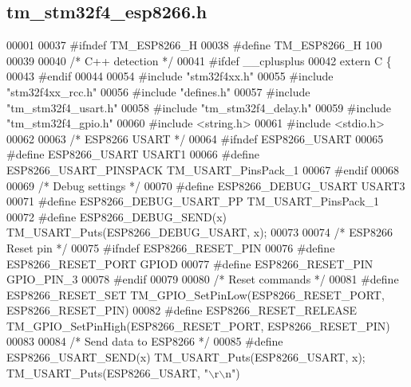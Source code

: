 \hypertarget{tm__stm32f4__esp8266_8h_source}{}\subsection{tm\+\_\+stm32f4\+\_\+esp8266.\+h}

\begin{DoxyCode}
00001 
00037 \textcolor{preprocessor}{#ifndef TM\_ESP8266\_H}
00038 \textcolor{preprocessor}{#define TM\_ESP8266\_H 100}
00039 
00040 \textcolor{comment}{/* C++ detection */}
00041 \textcolor{preprocessor}{#ifdef \_\_cplusplus}
00042 \textcolor{keyword}{extern} C \{
00043 \textcolor{preprocessor}{#endif}
00044 
00054 \textcolor{preprocessor}{#include "stm32f4xx.h"}
00055 \textcolor{preprocessor}{#include "stm32f4xx\_rcc.h"}
00056 \textcolor{preprocessor}{#include "defines.h"}
00057 \textcolor{preprocessor}{#include "tm\_stm32f4\_usart.h"}
00058 \textcolor{preprocessor}{#include "tm\_stm32f4\_delay.h"}
00059 \textcolor{preprocessor}{#include "tm\_stm32f4\_gpio.h"}
00060 \textcolor{preprocessor}{#include <string.h>}
00061 \textcolor{preprocessor}{#include <stdio.h>}
00062 
00063 \textcolor{comment}{/* ESP8266 USART */}
00064 \textcolor{preprocessor}{#ifndef ESP8266\_USART}
00065 \textcolor{preprocessor}{#define ESP8266\_USART               USART1}
00066 \textcolor{preprocessor}{#define ESP8266\_USART\_PINSPACK      TM\_USART\_PinsPack\_1}
00067 \textcolor{preprocessor}{#endif}
00068 
00069 \textcolor{comment}{/* Debug settings */}
00070 \textcolor{preprocessor}{#define ESP8266\_DEBUG\_USART         USART3}
00071 \textcolor{preprocessor}{#define ESP8266\_DEBUG\_USART\_PP      TM\_USART\_PinsPack\_1 }
00072 \textcolor{preprocessor}{#define ESP8266\_DEBUG\_SEND(x)       TM\_USART\_Puts(ESP8266\_DEBUG\_USART, x);}
00073 
00074 \textcolor{comment}{/* ESP8266 Reset pin */}
00075 \textcolor{preprocessor}{#ifndef ESP8266\_RESET\_PIN}
00076 \textcolor{preprocessor}{#define ESP8266\_RESET\_PORT          GPIOD}
00077 \textcolor{preprocessor}{#define ESP8266\_RESET\_PIN           GPIO\_PIN\_3}
00078 \textcolor{preprocessor}{#endif}
00079 
00080 \textcolor{comment}{/* Reset commands */}
00081 \textcolor{preprocessor}{#define ESP8266\_RESET\_SET           TM\_GPIO\_SetPinLow(ESP8266\_RESET\_PORT, ESP8266\_RESET\_PIN)}
00082 \textcolor{preprocessor}{#define ESP8266\_RESET\_RELEASE       TM\_GPIO\_SetPinHigh(ESP8266\_RESET\_PORT, ESP8266\_RESET\_PIN)}
00083 
00084 \textcolor{comment}{/* Send data to ESP8266 */}  
00085 \textcolor{preprocessor}{#define ESP8266\_USART\_SEND(x)       TM\_USART\_Puts(ESP8266\_USART, x); TM\_USART\_Puts(ESP8266\_USART, "\(\backslash\)r\(\backslash\)n")}

\end{DoxyCode}
